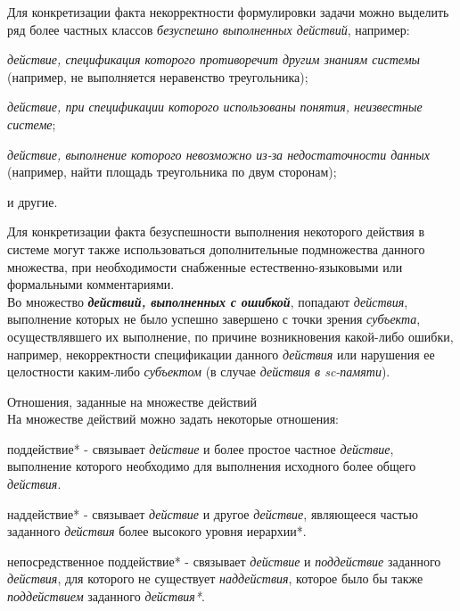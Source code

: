 \begin{frame}{}
Для конкретизации факта некорректности формулировки задачи можно выделить ряд более частных классов \textit{безуспешно выполненных действий}, например:
\begin{textitemize}
	\item \textit{действие, спецификация которого противоречит другим знаниям системы} (например, не выполняется неравенство треугольника);
	\item \textit{действие, при спецификации которого использованы понятия, неизвестные системе};
	\item \textit{действие, выполнение которого невозможно из-за недостаточности данных} (например, найти площадь треугольника по двум сторонам);
	\item и другие.
\end{textitemize}
\end{frame}

\begin{frame}{}
Для конкретизации факта безуспешности выполнения некоторого действия в системе могут также использоваться дополнительные подмножества данного множества, при необходимости снабженные естественно-языковыми или формальными комментариями.\\

Во множество \textbf{\textit{действий, выполненных с ошибкой}}, попадают \textit{действия}, выполнение которых не было успешно завершено с точки зрения \textit{субъекта}, осуществлявшего их выполнение, по причине возникновения какой-либо ошибки, например, некорректности спецификации данного \textit{действия} или нарушения ее целостности каким-либо \textit{субъектом} (в случае \textit{действия в sc-памяти}).
\end{frame}

\begin{frame}{Отношения, заданные на множестве действий}
\topline
 \\
 \bigskip
    На множестве действий можно задать некоторые отношения:
    \begin{textitemize}
        \item поддействие* - связывает \textit{действие} и более простое частное \textit{действие}, выполнение которого необходимо для выполнения исходного более общего \textit{действия}.
        \item наддействие* - связывает \textit{действие} и другое \textit{действие}, являющееся частью заданного \textit{действия} более высокого уровня иерархии*.
        \item непосредственное поддействие* - связывает \textit{действие} и \textit{поддействие} заданного \textit{действия}, для которого не существует \textit{наддействия}, которое было бы также \textit{поддействием} заданного \textit{действия*}.
    \end{textitemize}
\end{frame}

